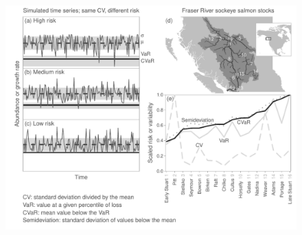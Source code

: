 \begin{figure}[htbp]
\centering
\includegraphics[width=5.5in]{risk-fig/risk-fig-bw.pdf}
\caption{}
\label{fig:risk}
\end{figure}

